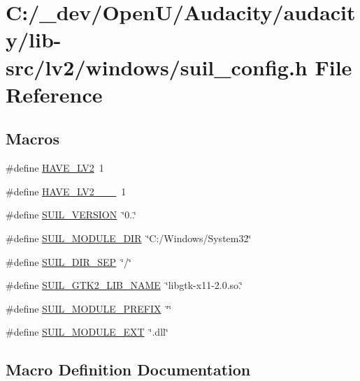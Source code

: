 \hypertarget{lib-src_2lv2_2windows_2suil__config_8h}{}\section{C\+:/\+\_\+dev/\+Open\+U/\+Audacity/audacity/lib-\/src/lv2/windows/suil\+\_\+config.h File Reference}
\label{lib-src_2lv2_2windows_2suil__config_8h}
\subsection*{Macros}
\begin{DoxyCompactItemize}
\item 
\#define \hyperlink{lib-src_2lv2_2windows_2suil__config_8h_a3377686d402043f36819f446ef0e0edd}{H\+A\+V\+E\+\_\+\+L\+V2}~1
\item 
\#define \hyperlink{lib-src_2lv2_2windows_2suil__config_8h_a2da14b31a59e3efae57c0ab8f46c18eb}{H\+A\+V\+E\+\_\+\+L\+V2\+\_\+\_\+\_}~1
\item 
\#define \hyperlink{lib-src_2lv2_2windows_2suil__config_8h_a36ff1ac58c3b45cc6964c38e4b76b4d2}{S\+U\+I\+L\+\_\+\+V\+E\+R\+S\+I\+ON}~\char`\"{}0..\char`\"{}
\item 
\#define \hyperlink{lib-src_2lv2_2windows_2suil__config_8h_a6f34ba79b7d71e94a6dd042abc293619}{S\+U\+I\+L\+\_\+\+M\+O\+D\+U\+L\+E\+\_\+\+D\+IR}~\char`\"{}C\+:/Windows/System32\char`\"{}
\item 
\#define \hyperlink{lib-src_2lv2_2windows_2suil__config_8h_a849cee5f74c808afbcbb5160a706d9d0}{S\+U\+I\+L\+\_\+\+D\+I\+R\+\_\+\+S\+EP}~\char`\"{}/\char`\"{}
\item 
\#define \hyperlink{lib-src_2lv2_2windows_2suil__config_8h_a2a4a442c56d9c0a71a94c5394af58c69}{S\+U\+I\+L\+\_\+\+G\+T\+K2\+\_\+\+L\+I\+B\+\_\+\+N\+A\+ME}~\char`\"{}libgtk-\/x11-\/2.\+0.so.\char`\"{}
\item 
\#define \hyperlink{lib-src_2lv2_2windows_2suil__config_8h_a7875042f0685b90513b92bd268baa764}{S\+U\+I\+L\+\_\+\+M\+O\+D\+U\+L\+E\+\_\+\+P\+R\+E\+F\+IX}~\char`\"{}\char`\"{}
\item 
\#define \hyperlink{lib-src_2lv2_2windows_2suil__config_8h_a518fd0d3499e315e0f8fb368d4583ad2}{S\+U\+I\+L\+\_\+\+M\+O\+D\+U\+L\+E\+\_\+\+E\+XT}~\char`\"{}.dll\char`\"{}
\end{DoxyCompactItemize}


\subsection{Macro Definition Documentation}
